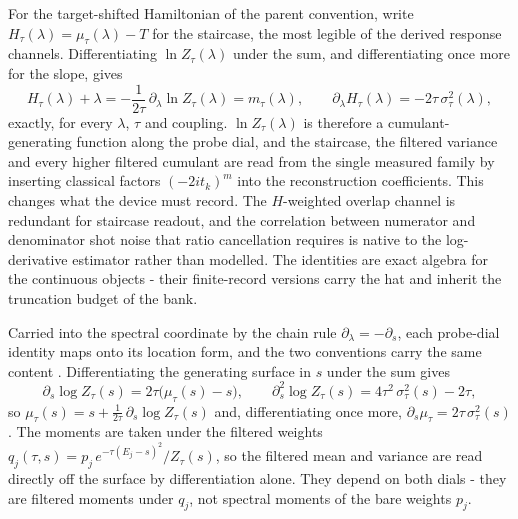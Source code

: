For the target-shifted Hamiltonian of the parent convention, write $H_\tau(\lambda)=\mu_\tau(\lambda)-T$ for the staircase, the most legible of the derived response channels. Differentiating $\ln Z_\tau(\lambda)$ under the sum, and differentiating once more for the slope, gives
\begin{equation}\label{thm:staircase-cumulant-identities}
H_\tau(\lambda)+\lambda=-\frac{1}{2\tau}\,\partial_\lambda \ln Z_\tau(\lambda)=m_\tau(\lambda),\qquad \partial_\lambda H_\tau(\lambda)=-2\tau\,\sigma_\tau^{2}(\lambda),
\end{equation}
exactly, for every $\lambda$, $\tau$ and coupling. $\ln Z_\tau(\lambda)$ is therefore a cumulant-generating function along the probe dial, and the staircase, the filtered variance and every higher filtered cumulant are read from the single measured family by inserting classical factors $(-2it_k)^{m}$ into the reconstruction coefficients. This changes what the device must record. The $H$-weighted overlap channel is redundant for staircase readout, and the correlation between numerator and denominator shot noise that ratio cancellation requires is native to the log-derivative estimator rather than modelled. The identities are exact algebra for the continuous objects - their finite-record versions carry the hat and inherit the truncation budget of the bank.

Carried into the spectral coordinate by the chain rule $\partial_\lambda=-\partial_s$, each probe-dial identity maps onto its location form, and the two conventions carry the same content \cite{mccaul2025snacks}. Differentiating the generating surface in $s$ under the sum gives
\begin{equation}\label{thm:response-identities-s}
\partial_s\log Z_\tau(s)=2\tau\bigl(\mu_\tau(s)-s\bigr),\qquad \partial_s^{2}\log Z_\tau(s)=4\tau^{2}\,\sigma_\tau^{2}(s)-2\tau,
\end{equation}
so $\mu_\tau(s)=s+\tfrac{1}{2\tau}\,\partial_s\log Z_\tau(s)$ and, differentiating once more, $\partial_s\mu_\tau=2\tau\,\sigma_\tau^{2}(s)$. The moments are taken under the filtered weights $q_j(\tau,s)=p_j\,e^{-\tau(E_j-s)^{2}}/Z_\tau(s)$, so the filtered mean and variance are read directly off the surface by differentiation alone. They depend on both dials - they are filtered moments under $q_j$, not spectral moments of the bare weights $p_j$.

